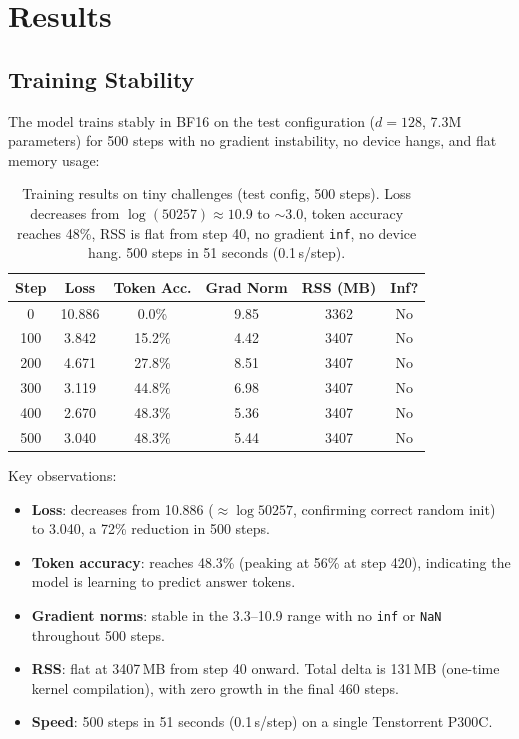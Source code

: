 \documentclass[11pt,a4paper]{article}
\begin{document}
\section{Results}
\label{sec:results}

\subsection{Training Stability}

The model trains stably in BF16 on the test configuration ($d{=}128$, 7.3M parameters) for 500 steps with no gradient instability, no device hangs, and flat memory usage:

\begin{table}[h]
\centering
\small
\begin{tabularx}{\textwidth}{c c c c c c}
\toprule
\textbf{Step} & \textbf{Loss} & \textbf{Token Acc.} & \textbf{Grad Norm} & \textbf{RSS (MB)} & \textbf{Inf?} \\
\midrule
0   & 10.886 & 0.0\%  & 9.85  & 3362 & No \\
100 & 3.842  & 15.2\% & 4.42  & 3407 & No \\
200 & 4.671  & 27.8\% & 8.51  & 3407 & No \\
300 & 3.119  & 44.8\% & 6.98  & 3407 & No \\
400 & 2.670  & 48.3\% & 5.36  & 3407 & No \\
500 & 3.040  & 48.3\% & 5.44  & 3407 & No \\
\bottomrule
\end{tabularx}
\caption{Training results on tiny challenges (test config, 500 steps). Loss decreases from $\log(50257) \approx 10.9$ to $\sim$3.0, token accuracy reaches 48\%, RSS is flat from step 40, no gradient \texttt{inf}, no device hang. 500 steps in 51 seconds (0.1\,s/step).}
\label{tab:training-results}
\end{table}

Key observations:
\begin{itemize}[nosep]
    \item \textbf{Loss}: decreases from 10.886 ($\approx \log 50257$, confirming correct random init) to 3.040, a 72\% reduction in 500 steps.
    \item \textbf{Token accuracy}: reaches 48.3\% (peaking at 56\% at step 420), indicating the model is learning to predict answer tokens.
    \item \textbf{Gradient norms}: stable in the 3.3--10.9 range with no \texttt{inf} or \texttt{NaN} throughout 500 steps.
    \item \textbf{RSS}: flat at 3407\,MB from step 40 onward. Total delta is 131\,MB (one-time kernel compilation), with zero growth in the final 460 steps.
    \item \textbf{Speed}: 500 steps in 51 seconds (0.1\,s/step) on a single Tenstorrent P300C.
\end{itemize}
\end{document}
